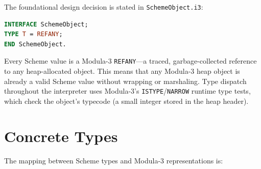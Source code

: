 \documentclass[12pt]{report}
\begin{document}
The foundational design decision is stated in \texttt{SchemeObject.i3}:

\begin{lstlisting}[language=Modula3]
INTERFACE SchemeObject;
TYPE T = REFANY;
END SchemeObject.
\end{lstlisting}

Every Scheme value is a Modula-3 \texttt{REFANY}---a traced, garbage-collected
reference to any heap-allocated object.  This means that any Modula-3 heap
object is already a valid Scheme value without wrapping or marshaling.
Type dispatch throughout the interpreter uses Modula-3's
\texttt{ISTYPE}/\texttt{NARROW} runtime type tests, which check the
object's typecode (a small integer stored in the heap header).

\section{Concrete Types}

The mapping between Scheme types and Modula-3 representations is:
\end{document}
